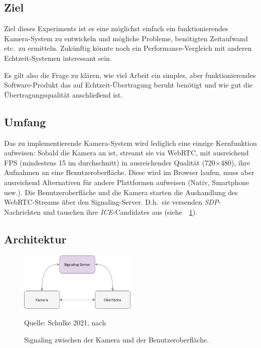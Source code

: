 \documentclass{article}
\newcommand{\figuresource}[1]{
	\begin{center}Quelle: #1\end{center}
}
\begin{document}
\begin{onecolumn}
\subsection{Ziel}

Ziel dieses Experiments ist es eine möglichst einfach ein funktionierendes
Kamera-System zu entwickeln und mögliche Probleme, benötigten Zeitaufwand etc.\
zu ermitteln. Zukünftig könnte noch ein Performance-Vergleich mit anderen
Echtzeit-Systemen interessant sein.

Es gilt also die Frage zu klären, wie viel Arbeit ein simples, aber
funktionierendes Software-Produkt das auf Echtzeit-Übertragung beruht benötigt
und wie gut die Übertragungsqualität anschließend ist.

\subsection{Umfang}

Das zu implementierende Kamera-System wird lediglich eine einzige
Kernfunktion aufweisen: Sobald die Kamera an ist, streamt sie via
WebRTC, mit ausreichend FPS (mindestens 15 im durchschnitt) in
ausreichender Qualität (720$\times$480), ihre Aufnahmen an eine
Benutzeroberfläche. Diese wird im Browser laufen, muss aber ausreichend
Alternativen für andere Plattformen aufweisen (Nativ, Smartphone
usw.). Die Benutzeroberfläche und die Kamera starten die Aushandlung des
WebRTC-Streams über den Signaling-Server. D.h.\ sie versenden
\textit{SDP}-Nachrichten und tauschen ihre \textit{ICE}-Candidates aus
(siehe~\figurename~\ref{fig:signaling}).

\subsection{Architektur}

\begin{figure}[ht]
	\includegraphics[width=0.5\textwidth]{diagram-signaling}
	\centering
	\caption{Signaling zwischen der Kamera und der Benutzeroberfläche.}\label{fig:signaling}
	\figuresource{Schulke 2021, nach~\cite{WebRTC}}
\end{figure}


\end{onecolumn}
\end{document}
